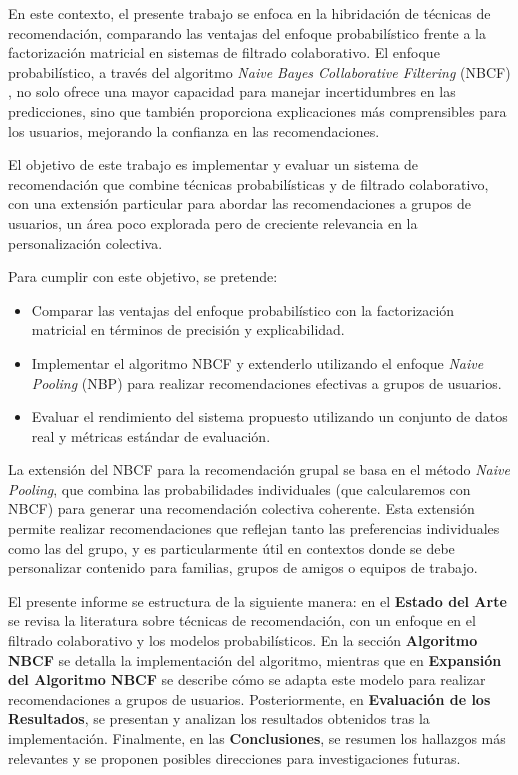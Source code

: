 \documentclass[runningheads,a4paper]{llncs}
\begin{document}
En este contexto, el presente trabajo se enfoca en la hibridación de técnicas de recomendación, comparando las ventajas del enfoque probabilístico frente a la factorización matricial en sistemas de filtrado colaborativo. El enfoque probabilístico, a través del algoritmo \textit{Naive Bayes Collaborative Filtering} (NBCF) \cite{nbcf}, no solo ofrece una mayor capacidad para manejar incertidumbres en las predicciones, sino que también proporciona explicaciones más comprensibles para los usuarios, mejorando la confianza en las recomendaciones. 

El objetivo de este trabajo es implementar y evaluar un sistema de recomendación que combine técnicas probabilísticas y de filtrado colaborativo, con una extensión particular para abordar las recomendaciones a grupos de usuarios, un área poco explorada pero de creciente relevancia en la personalización colectiva.

Para cumplir con este objetivo, se pretende:
\begin{itemize}
    \item Comparar las ventajas del enfoque probabilístico con la factorización matricial en términos de precisión y explicabilidad.
    \item Implementar el algoritmo NBCF y extenderlo utilizando el enfoque \textit{Naive Pooling} (NBP) \cite{nbp} para realizar recomendaciones efectivas a grupos de usuarios.
    \item Evaluar el rendimiento del sistema propuesto utilizando un conjunto de datos real y métricas estándar de evaluación.
\end{itemize}

La extensión del NBCF para la recomendación grupal 
se basa en el método \textit{Naive Pooling}, 
que combina las probabilidades individuales (que calcularemos 
con NBCF) para generar una recomendación colectiva coherente. Esta extensión permite realizar recomendaciones que reflejan tanto las preferencias individuales como las del grupo, y es particularmente útil en contextos donde se debe personalizar contenido para familias, grupos de amigos o equipos de trabajo.

El presente informe se estructura de la siguiente manera: en el \textbf{Estado del Arte} se revisa la literatura sobre técnicas de recomendación, con un enfoque en el filtrado colaborativo y los modelos probabilísticos. En la sección \textbf{Algoritmo NBCF} se detalla la implementación del algoritmo, mientras que en \textbf{Expansión del Algoritmo NBCF} se describe cómo se adapta este modelo para realizar recomendaciones a grupos de usuarios. Posteriormente, en \textbf{Evaluación de los Resultados}, se presentan y analizan los resultados obtenidos tras la implementación. Finalmente, en las \textbf{Conclusiones}, se resumen los hallazgos más relevantes y se proponen posibles direcciones para investigaciones futuras.
\end{document}
